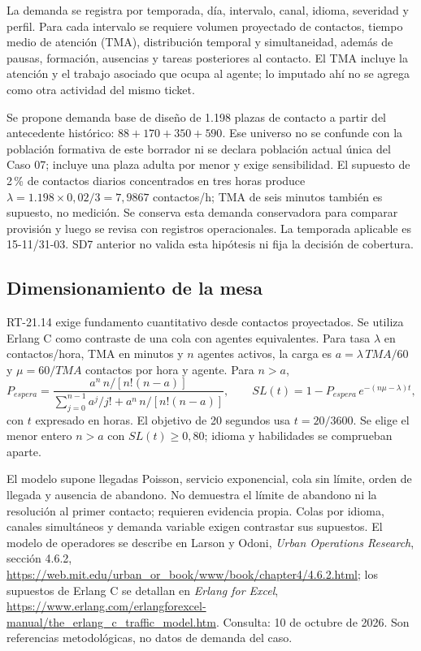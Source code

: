 La demanda se registra por temporada, día, intervalo, canal, idioma, severidad y perfil. Para cada intervalo se requiere volumen proyectado de contactos, tiempo medio de atención (TMA), distribución temporal y simultaneidad, además de pausas, formación, ausencias y tareas posteriores al contacto. El TMA incluye la atención y el trabajo asociado que ocupa al agente; lo imputado ahí no se agrega como otra actividad del mismo ticket.

Se propone demanda base de diseño de 1.198 plazas de contacto a partir del antecedente histórico: $88+170+350+590$. Ese universo no se confunde con la población formativa de este borrador ni se declara población actual única del Caso 07; incluye una plaza adulta por menor y exige sensibilidad. El supuesto de 2\,\% de contactos diarios concentrados en tres horas produce $\lambda=1.198\times0{,}02/3=7{,}9867$ contactos/h; TMA de seis minutos también es supuesto, no medición. Se conserva esta demanda conservadora para comparar provisión y luego se revisa con registros operacionales. La temporada aplicable es 15-11/31-03. SD7 anterior no valida esta hipótesis ni fija la decisión de cobertura.

\subsection{Dimensionamiento de la mesa}
RT-21.14 exige fundamento cuantitativo desde contactos proyectados. Se utiliza Erlang C como contraste de una cola con agentes equivalentes. Para tasa $\lambda$ en contactos/hora, TMA en minutos y $n$ agentes activos, la carga es $a=\lambda\,TMA/60$ y $\mu=60/TMA$ contactos por hora y agente. Para $n>a$,
\[
P_{espera}=\frac{a^n\,n/[n!(n-a)]}
{\displaystyle\sum_{j=0}^{n-1}a^j/j!+a^n\,n/[n!(n-a)]},
\qquad SL(t)=1-P_{espera}\,e^{-(n\mu-\lambda)t},
\]
con $t$ expresado en horas. El objetivo de 20 segundos usa $t=20/3600$. Se elige el menor entero $n>a$ con $SL(t)\geq0{,}80$; idioma y habilidades se comprueban aparte.

El modelo supone llegadas Poisson, servicio exponencial, cola sin límite, orden de llegada y ausencia de abandono. No demuestra el límite de abandono ni la resolución al primer contacto; requieren evidencia propia. Colas por idioma, canales simultáneos y demanda variable exigen contrastar sus supuestos. El modelo de operadores se describe en Larson y Odoni, \textit{Urban Operations Research}, sección 4.6.2, \url{https://web.mit.edu/urban_or_book/www/book/chapter4/4.6.2.html}; los supuestos de Erlang C se detallan en \textit{Erlang for Excel}, \url{https://www.erlang.com/erlangforexcel-manual/the_erlang_c_traffic_model.htm}. Consulta: 10 de octubre de 2026. Son referencias metodológicas, no datos de demanda del caso.

